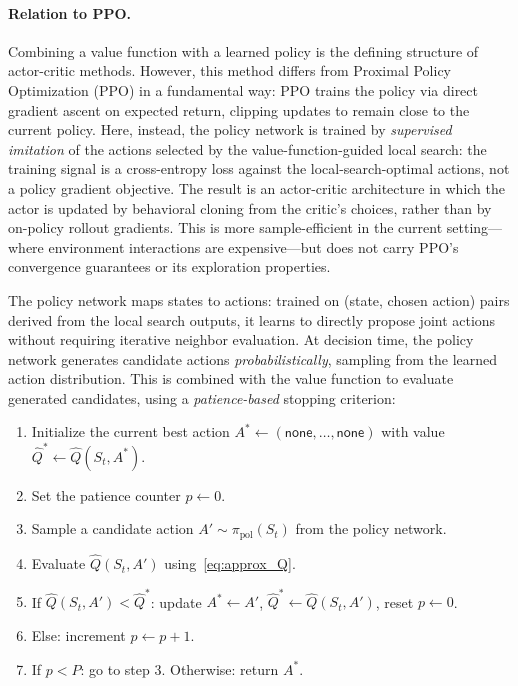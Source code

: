 \documentclass[3p, twocolumn]{elsarticle}
\begin{document}
\paragraph{Relation to PPO.}
Combining a value function with a learned policy is the defining structure of actor-critic methods. However, this method differs from Proximal Policy Optimization (PPO) in a fundamental way: PPO trains the policy via direct gradient ascent on expected return, clipping updates to remain close to the current policy. Here, instead, the policy network is trained by \emph{supervised imitation} of the actions selected by the value-function-guided local search: the training signal is a cross-entropy loss against the local-search-optimal actions, not a policy gradient objective. The result is an actor-critic architecture in which the actor is updated by behavioral cloning from the critic's choices, rather than by on-policy rollout gradients. This is more sample-efficient in the current setting---where environment interactions are expensive---but does not carry PPO's convergence guarantees or its exploration properties.

The policy network maps states to actions: trained on (state, chosen action) pairs derived from the local search outputs, it learns to directly propose joint actions without requiring iterative neighbor evaluation. At decision time, the policy network generates candidate actions \emph{probabilistically}, sampling from the learned action distribution. This is combined with the value function to evaluate generated candidates, using a \emph{patience-based} stopping criterion:

\begin{enumerate}
    \item Initialize the current best action $A^* \leftarrow (\textsf{none}, \ldots, \textsf{none})$ with value $\hat{Q}^* \leftarrow \hat{Q}(S_t, A^*)$.
    \item Set the patience counter $p \leftarrow 0$.
    \item Sample a candidate action $A' \sim \pi_{\text{pol}}(S_t)$ from the policy network.
    \item Evaluate $\hat{Q}(S_t, A')$ using~\eqref{eq:approx_Q}.
    \item If $\hat{Q}(S_t, A') < \hat{Q}^*$: update $A^* \leftarrow A'$, $\hat{Q}^* \leftarrow \hat{Q}(S_t, A')$, reset $p \leftarrow 0$.
    \item Else: increment $p \leftarrow p + 1$.
    \item If $p < P$: go to step 3. Otherwise: return $A^*$.
\end{enumerate}
\end{document}

